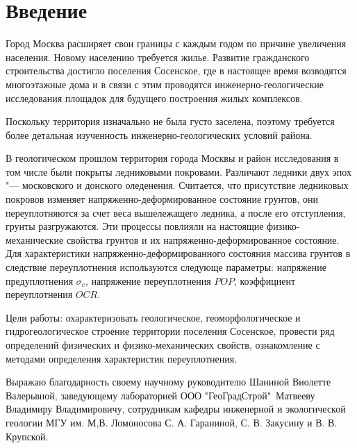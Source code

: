 \chapter*{Введение}                         %

Город Москва расширяет свои границы с каждым годом по причине увеличения населения. 
Новому населению требуется жилье. Развитие гражданского строительства достигло поселения 
Сосенское, где в настоящее время возводятся многоэтажные дома и в связи с этим проводятся 
инженерно-геологические исследования площадок для будущего построения жилых 
комплексов. %



Поскольку территория изначально не была густо заселена, поэтому требуется более детальная 
изученность инженерно-геологических условий района.

%
В геологическом прошлом территория города Москвы и район исследования в том числе были 
покрыты ледниковыми покровами. Различают ледники двух эпох "--- московского и донского оледенения. 
Считается, что присутствие ледниковых покровов изменяет напряженно-деформированное состояние 
грунтов, они переуплотняются за счет веса вышележащего ледника, а после его отступления, 
грунты разгружаются. Эти процессы повлияли на настоящие физико-механические свойства грунтов 
и их напряженно-деформированное состояние. Для характеристики напряженно-деформированного 
состояния массива грунтов в следствие переуплотнения используются следующе параметры:
напряжение предуплотнения $\sigma_c$, 
напряжение переуплотнения $POP$,
коэффициент переуплотнения $OCR$.

Цели работы: охарактеризовать геологическое, геоморфологическое и 
гидрогеологическое строение территории поселения Сосенское, провести ряд 
определений физических и физико-механических 
свойств, ознакомление с методами определения характеристик переуплотнения.


Выражаю благодарность своему научному руководителю Шаниной 
Виолетте Валерьвной, заведующему лабораторией ООО "ГеоГрадСтрой"\ 
Матвееву Владимиру Владимировичу, сотрудникам кафедры инженерной 
и экологической геологии МГУ им. М,В. Ломоносова С. А. Гараниной, С. В. Закусину и 
В. В. Крупской.
